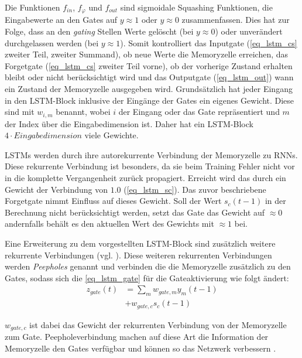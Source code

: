 Die Funktionen $f_{in}$, $f_{\varphi}$ und $f_{out}$ sind sigmoidale Squashing
Funktionen, die Eingabewerte an den Gates auf $y\approx1$ oder $y\approx0$
zusammenfassen. Dies hat zur Folge, dass an den \textit{gating} Stellen Werte
gelöscht (bei $y\approx0$) oder unverändert durchgelassen werden (bei
$y\approx1$). Somit kontrolliert das Inputgate (\autoref{eq_lstm_cs} zweiter
Teil, zweiter Summand), ob neue Werte die Memoryzelle erreichen, das Forgetgate
(\autoref{eq_lstm_cs} zweiter Teil vorne), ob der vorherige Zustand erhalten
bleibt oder nicht berücksichtigt wird und das Outputgate (\autoref{eq_lstm_out})
wann ein Zustand der Memoryzelle ausgegeben wird. Grundsätzlich hat jeder
Eingang in den \ac{LSTM}-Block inklusive der Eingänge der Gates ein eigenes
Gewicht. Diese sind mit $w_{i,m}$ benannt, wobei $i$ der Eingang oder das Gate
repräsentiert und $m$ der Index über die Eingabedimension ist. Daher hat ein
\ac{LSTM}-Block $4\cdot Eingabedimension$ viele Gewichte. 

\acp{LSTM} werden durch ihre autorekurrente Verbindung der Memoryzelle zu
\acp{RNN}. Diese rekurrente Verbindung ist besonders, da sie beim Training
Fehler nicht vor in die komplette Vergangenheit zurück propagiert. Erreicht wird
das durch ein Gewicht der Verbindung von $1.0$ (\autoref{eq_lstm_sc}). Das zuvor
beschriebene Forgetgate nimmt Einfluss auf dieses Gewicht. Soll der Wert
$s_c(t-1)$ in der Berechnung nicht berücksichtigt werden, setzt das Gate das
Gewicht auf $\approx0$ andernfalls behält es den aktuellen Wert des Gewichts mit
$\approx1$ bei. 

Eine Erweiterung zu dem vorgestellten \ac{LSTM}-Block sind zusätzlich weitere
rekurrente Verbindungen (vgl. \cite{Gers2002b}). Diese weiteren rekurrenten
Verbindungen werden \textit{Peepholes} genannt und verbinden die die Memoryzelle
zusätzlich zu den Gates, sodass sich die \autoref{eq_lstm_gate} für die Gateaktivierung
wie folgt ändert:
\begin{equation}
\label{eq_lstm_gate_peephole}
\begin{split}
z_{gate}(t) &= \sum \limits_{m} w_{gate,m}y_m(t-1) \\
			&+ w_{gate,c} s_c(t-1)
\end{split}
\end{equation}

$w_{gate,c}$ ist dabei das Gewicht der rekurrenten Verbindung von der
Memoryzelle zum Gate. Peepholeverbindung machen auf diese Art die Information
der Memoryzelle den Gates verfügbar und können so das Netzwerk verbessern
\cite{Gers2002b}. 

